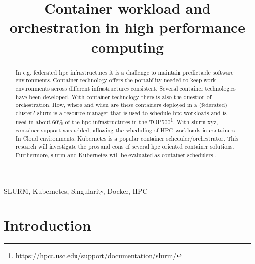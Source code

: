 \documentclass[conference]{IEEEtran}
\begin{document}
\title{Container workload and orchestration in high performance computing}

\author{
}

\maketitle

\begin{abstract}
In e.g. federated \gls{hpc} infrastructures it is a challenge to maintain predictable software environments. Container technology offers the portability needed to keep work environments across different infrastructures consistent. Several container technologies have been developed. With container technology there is also the question of orchestration. How, where and when are these containers deployed in a  (federated) cluster? \gls{slurm} is a resource manager that is used to schedule \gls{hpc} workloads and is used in about 60\% of the \gls{hpc} infrastructures in the TOP500\footnote{\url{https://hpcc.usc.edu/support/documentation/slurm/}}. With \gls{slurm} xyz, container support was added, allowing the scheduling of HPC workloads in containers. In Cloud environments, Kubernetes is a popular container scheduler/orchestrator. This research will investigate the pros and cons of several \gls{hpc} oriented container solutions. Furthermore, \gls{slurm} and Kubernetes will be evaluated as container schedulers \cite{cartesius-userinfo}.
\end{abstract}

\begin{IEEEkeywords}
SLURM, Kubernetes, Singularity, Docker, HPC
\end{IEEEkeywords}


\section{Introduction}



\end{document}
